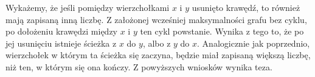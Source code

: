 \vspace{10px}
\noindent
Wykażemy, że jeśli pomiędzy wierzchołkami $x$ i $y$ usunięto krawędź, to również mają zapisaną inną liczbę. Z założonej wcześniej maksymalności grafu bez cyklu, po dołożeniu krawędzi między $x$ i $y$ ten cykl powstanie. Wynika z tego to, że po jej usunięciu istnieje ścieżka z $x$ do $y$, albo z $y$ do $x$. Analogicznie jak poprzednio, wierzchołek w którym ta ścieżka się zaczyna, będzie miał zapisaną większą liczbę, niż ten, w którym się ona kończy. Z powyższych wniosków wynika teza.